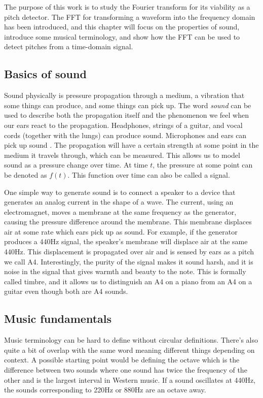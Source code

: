 The purpose of this work is to study the Fourier transform for its viability as a pitch detector. The FFT for transforming a waveform into the frequency domain has been introduced, and this chapter will focus on the properties of sound, introduce some musical terminology, and show how the FFT can be used to detect pitches from a time-domain signal.

\subsection{Basics of sound}
Sound physically is pressure propagation through a medium, a vibration that some things can produce, and some things can pick up. The word \textit{sound} can be used to describe both the propagation itself and the phenomenon we feel when our ears react to the propagation. Headphones, strings of a guitar, and vocal cords (together with the lungs) can produce sound. Microphones and ears can pick up sound \cite{RossingMooreWheeler}. The propagation will have a certain strength at some point in the medium it travels through, which can be measured. This allows us to model sound as a pressure change over time. At time $t$, the pressure at some point can be denoted as $f(t)$. This function over time can also be called a signal.

One simple way to generate sound is to connect a speaker to a device that generates an analog current in the shape of a wave. The current, using an electromagnet, moves a membrane at the same frequency as the generator, causing the pressure difference around the membrane. This membrane displaces air at some rate which ears pick up as sound. For example, if the generator produces a 440Hz signal, the speaker's membrane will displace air at the same 440Hz. This displacement is propagated over air and is sensed by ears as a pitch we call A4. Interestingly, the purity of the signal makes it sound harsh, and it is noise in the signal that gives warmth and beauty to the note. This is formally called timbre, and it allows us to distinguish an A4 on a piano from an A4 on a guitar even though both are A4 sounds.


\subsection{Music fundamentals} 
Music terminology can be hard to define without circular definitions. There's also quite a bit of overlap with the same word meaning different things depending on context. A possible starting point would be defining the octave which is the difference between two sounds where one sound has twice the frequency of the other and is the largest interval in Western music. If a sound oscillates at 440Hz, the sounds corresponding to 220Hz or 880Hz are an octave away.


